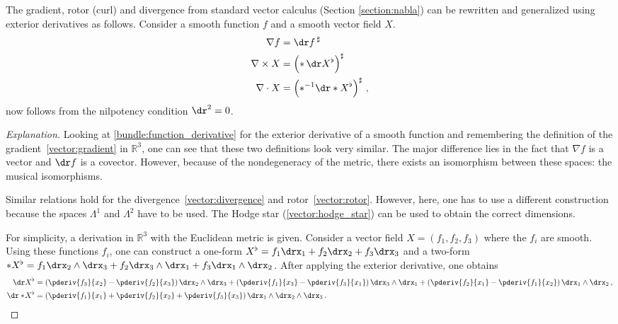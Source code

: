     \begin{remark}\label{bundle:vector_calculus}
        The gradient, rotor (curl) and divergence from standard vector calculus (Section \ref{section:nabla}) can be rewritten and generalized using exterior derivatives as follows. Consider a smooth function $f$ and a smooth vector field $X$.
        \begin{gather}
            \begin{aligned}
                \nabla f &= \dr f\,^\sharp\\
                \nabla\times X &= \left(\ast\,\dr X^\flat\right)^\sharp\\
                \nabla\cdot X &= \left(\ast^{-1}\dr\ast X^\flat\right)^\sharp\,,
            \end{aligned}
        \end{gather}
         now follows from the nilpotency condition $\dr^2=0$.
        \begin{mdframed}[roundcorner=10pt, linecolor=blue, linewidth=1pt]
            \begin{proof}[Explanation]
                Looking at \cref{bundle:function_derivative} for the exterior derivative of a smooth function and remembering the definition of the gradient~\ref{vector:gradient} in $\mathbb{R}^3$, one can see that these two definitions look very similar. The major difference lies in the fact that $\nabla f$ is a vector and $\dr f$ is a covector. However, because of the nondegeneracy of the metric, there exists an isomorphism between these spaces: the musical isomorphisms.

                Similar relations hold for the divergence~\ref{vector:divergence} and rotor~\ref{vector:rotor}. However, here, one has to use a different construction because the spaces $\Lambda^1$ and $\Lambda^2$ have to be used. The Hodge star (\cref{vector:hodge_star}) can be used to obtain the correct dimensions.

                For simplicity, a derivation in $\mathbb{R}^3$ with the Euclidean metric is given. Consider a vector field $X = (f_1,f_2,f_3)$ where the $f_i$ are smooth. Using these functions $f_i$, one can construct a one-form $X^\flat = f_1\drx_1 + f_2\drx_2 + f_3\drx_3$ and a two-form $\ast X^\flat = f_1\drx_2\wedge\drx_3 + f_2\drx_3\wedge\drx_1 + f_3\drx_1\wedge\drx_2$. After applying the exterior derivative, one obtains
                \begin{align*}
                    \dr X^\flat &= \left(\pderiv{f_3}{x_2} - \pderiv{f_2}{x_3}\right)\drx_2\wedge\drx_3 + \left(\pderiv{f_1}{x_3} - \pderiv{f_3}{x_1}\right)\drx_3\wedge\drx_1 + \left(\pderiv{f_2}{x_1} - \pderiv{f_1}{x_2}\right)\drx_1\wedge\drx_2\,,\\
                    \dr\ast\!X^\flat &= \left(\pderiv{f_1}{x_1} + \pderiv{f_2}{x_2} + \pderiv{f_3}{x_3}\right)\drx_1\wedge\drx_2\wedge\drx_3\,.
                \end{align*}$ $
            \end{proof}
        \end{mdframed}
    \end{remark}

